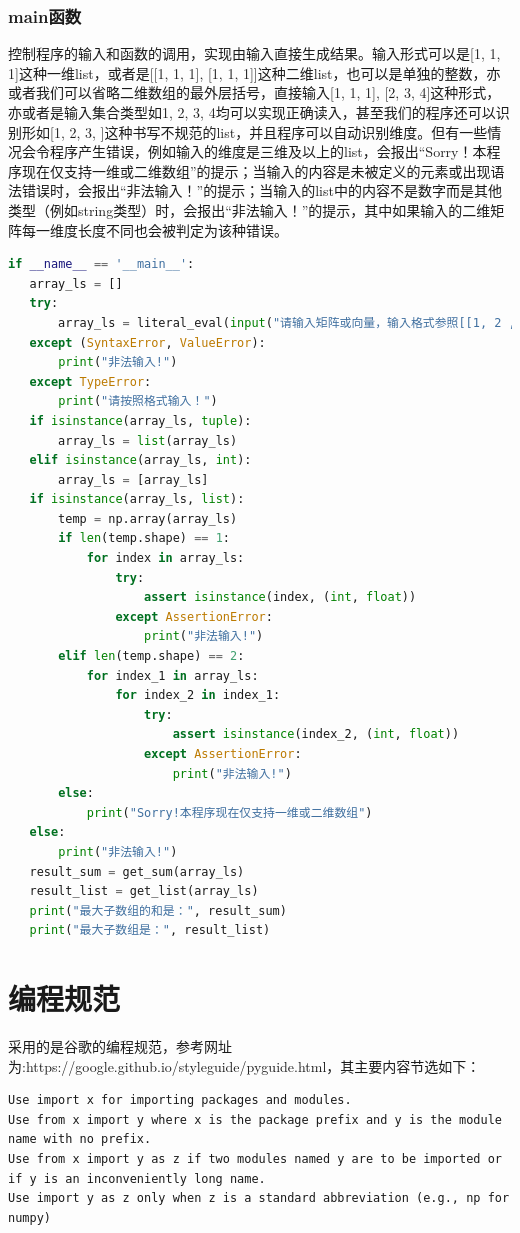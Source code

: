 \documentclass{article}
\begin{document}
\subsubsection{main函数}
控制程序的输入和函数的调用，实现由输入直接生成结果。输入形式可以是[1, 1, 1]这种一维list，或者是[[1, 1, 1], [1, 1, 1]]这种二维list，也可以是单独的整数，亦或者我们可以省略二维数组的最外层括号，直接输入[1, 1, 1], [2, 3, 4]这种形式，亦或者是输入集合类型如{1, 2, 3, 4}均可以实现正确读入，甚至我们的程序还可以识别形如[1, 2, 3, ]这种书写不规范的list，并且程序可以自动识别维度。\textcolor[rgb]{0,0.8,1}{但有一些情况会令程序产生错误，例如输入的维度是三维及以上的list，会报出“Sorry！本程序现在仅支持一维或二维数组”的提示；当输入的内容是未被定义的元素或出现语法错误时，会报出“非法输入！”的提示；当输入的list中的内容不是数字而是其他类型（例如string类型）时，会报出“非法输入！”的提示，其中如果输入的二维矩阵每一维度长度不同也会被判定为该种错误。}
\begin{lstlisting}[language = Python]
if __name__ == '__main__':
   array_ls = []
   try:
       array_ls = literal_eval(input("请输入矩阵或向量，输入格式参照[[1, 2 ,3], [4, 5, 6]]或[1, 2, 3, 4], [1, 2, 3, 4]:"))
   except (SyntaxError, ValueError):
       print("非法输入!")
   except TypeError:
       print("请按照格式输入！")
   if isinstance(array_ls, tuple):
       array_ls = list(array_ls)
   elif isinstance(array_ls, int):
       array_ls = [array_ls]
   if isinstance(array_ls, list):
       temp = np.array(array_ls)
       if len(temp.shape) == 1:
           for index in array_ls:
               try:
                   assert isinstance(index, (int, float))
               except AssertionError:
                   print("非法输入!")
       elif len(temp.shape) == 2:
           for index_1 in array_ls:
               for index_2 in index_1:
                   try:
                       assert isinstance(index_2, (int, float))
                   except AssertionError:
                       print("非法输入!")
       else:
           print("Sorry!本程序现在仅支持一维或二维数组")
   else:
       print("非法输入!")
   result_sum = get_sum(array_ls)
   result_list = get_list(array_ls)
   print("最大子数组的和是：", result_sum)
   print("最大子数组是：", result_list)

\end{lstlisting}
\section{编程规范}
\large 
采用的是谷歌的编程规范，参考网址为:https://google.github.io/styleguide/pyguide.html，其主要内容节选如下：
\begin{lstlisting}
Use import x for importing packages and modules.
Use from x import y where x is the package prefix and y is the module name with no prefix.
Use from x import y as z if two modules named y are to be imported or if y is an inconveniently long name.
Use import y as z only when z is a standard abbreviation (e.g., np for numpy) 
\end{lstlisting}
\end{document}

